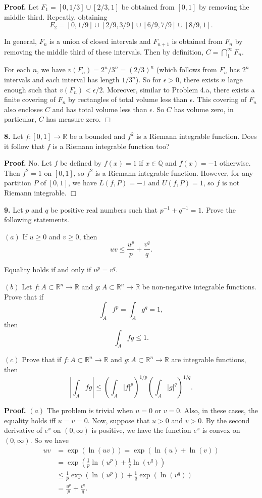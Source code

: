 \documentclass{article}
\begin{document}
    \textbf{Proof.} Let $F_1 = [0,1/3] \cup [2/3,1]$ be obtained from
$[0,1]$ by removing the middle third. Repeatly, obtaining
\[F_2 = [0,1/9]\cup [2/9,3/9] \cup [6/9,7/9] \cup [8/9,1].\]

In general, $F_n$ is a union of closed intervals and $F_{n+1}$ is
obtained from $F_n$ by removing the middle third of these intervals.
Then by definition, $C = \bigcap_{1}^{\infty} F_n$.

For each $n$, we have $v(F_n) = 2^n / 3^n = (2/3)^n$ (which follows from
$F_n$ has $2^n$ intervals and each interval has length $1/3^n$). So for
$\epsilon > 0$, there exists $n$ large enough such that
$v(F_n) < \epsilon /2$. Moreover, similar to Problem 4.a, there exists a
finite covering of $F_n$ by rectangles of total volume less than
$\epsilon$. This covering of $F_n$ also encloses $C$ and has total
volume less than $\epsilon$. So $C$ has volume zero, in particular, $C$
has measure zero. $\Box$

    \textbf{8.} Let $f:[0,1]\to \mathbb{R}$ be a bounded and $f^2$ is a
Riemann integrable function. Does it follow that $f$ is a Riemann
integrable function too?

    \textbf{Proof.} No. Let $f$ be defined by $f(x) = 1$ if
$x \in \mathbb{Q}$ and $f(x) = -1$ otherwise. Then $f^2 =1$ on $[0,1]$,
so $f^2$ is a Riemann integrable function. However, for any partition
$P$ of $[0,1]$, we have $L(f,P) = -1$ and $U(f,P) = 1$, so $f$ is not
Riemann integrable. $\Box$

    \textbf{9.} Let $p$ and $q$ be positive real numbers such that
$p^{-1}+q^{-1} =1$. Prove the following statements.

$(a)$ If $u\ge 0$ and $v\ge 0$, then
\[uv \le \frac{u^p}{p} + \frac{v^q}{q}.\]

Equality holds if and only if $u^p = v^q$.

$(b)$ Let $f:A\subset \mathbb{R}^n \to \mathbb{R}$ and
$g:A\subset \mathbb{R}^n \to \mathbb{R}$ be non-negative integrable
functions. Prove that if \[\int_A f^p = \int_A g^q = 1,\] then
\[\int_A fg \le 1.\]

$(c)$ Prove that if $f:A \subset \mathbb{R}^n \to \mathbb{R}$ and
$g:A\subset \mathbb{R}^n \to \mathbb{R}$ are integrable functions, then
\[\left|\int_A fg\right| \le \left(\int_A |f|^p\right)^{1/p} \left(\int_A |g|^q\right)^{1/q}.\]

    \textbf{Proof.} $(a)$ The problem is trivial when $u = 0$ or $v=0$.
Also, in these cases, the equality holds iff $u = v =0$. Now, suppose
that $u >0$ and $v > 0$. By the second derivative of $e^x$ on
$(0,\infty)$ is positive, we have the function $e^x$ is convex on
$(0,\infty)$. So we have \[\begin{aligned}
uv &= \exp(\ln(uv)) = \exp(\ln(u) + \ln(v))\\
&= \exp\left(\frac{1}{p}\ln(u^p) + \frac{1}{q}\ln(v^q)\right) \\
& \le \frac{1}{p}\exp(\ln(u^p)) +\frac{1}{q}\exp(\ln(v^q)) \\
&= \frac{u^p}{p} + \frac{v^q}{q}.
\end{aligned}\]
\end{document}
